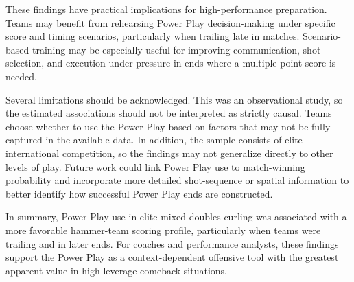 \documentclass[titlepage, 12pt]{article}
\begin{document}
These findings have practical implications for high-performance preparation.
Teams may benefit from rehearsing Power Play decision-making under specific
score and timing scenarios, particularly when trailing late in matches.
Scenario-based training may be especially useful for improving communication,
shot selection, and execution under pressure in ends where a multiple-point
score is needed.

Several limitations should be acknowledged. This was an observational study, so
the estimated associations should not be interpreted as strictly causal. Teams
choose whether to use the Power Play based on factors that may not be fully
captured in the available data. In addition, the sample consists of elite
international competition, so the findings may not generalize directly to other
levels of play. Future work could link Power Play use to match-winning
probability and incorporate more detailed shot-sequence or spatial information
to better identify how successful Power Play ends are constructed.

In summary, Power Play use in elite mixed doubles curling was associated with a
more favorable hammer-team scoring profile, particularly when teams were
trailing and in later ends. For coaches and performance analysts, these
findings support the Power Play as a context-dependent offensive tool with the
greatest apparent value in high-leverage comeback situations.


\clearpage

\end{document}

